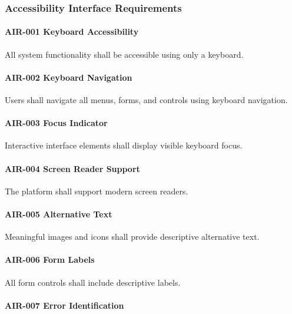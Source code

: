 
\subsubsection*{Accessibility Interface Requirements}

\paragraph{AIR-001 Keyboard Accessibility}

All system functionality shall be accessible using only a keyboard.

\paragraph{AIR-002 Keyboard Navigation}

Users shall navigate all menus, forms, and controls using keyboard
navigation.

\paragraph{AIR-003 Focus Indicator}

Interactive interface elements shall display visible keyboard focus.

\paragraph{AIR-004 Screen Reader Support}

The platform shall support modern screen readers.

\paragraph{AIR-005 Alternative Text}

Meaningful images and icons shall provide descriptive alternative text.

\paragraph{AIR-006 Form Labels}

All form controls shall include descriptive labels.

\paragraph{AIR-007 Error Identification}

